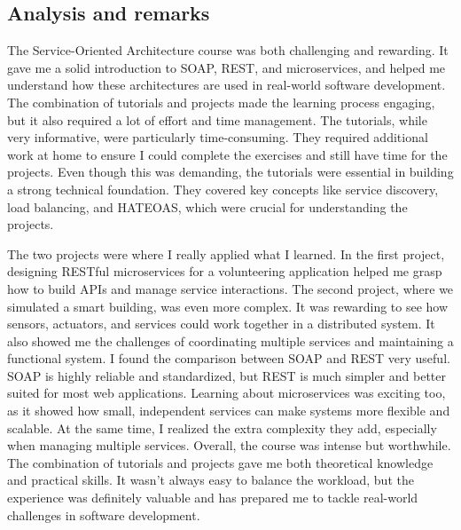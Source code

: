 \subsection{Analysis and remarks}

\indent \indent The Service-Oriented Architecture course was both challenging and rewarding. It gave me a solid introduction to SOAP, REST, and microservices, and helped me understand how these architectures are used in real-world software development. The combination of tutorials and projects made the learning process engaging, but it also required a lot of effort and time management.
\noindent The tutorials, while very informative, were particularly time-consuming. They required additional work at home to ensure I could complete the exercises and still have time for the projects. Even though this was demanding, the tutorials were essential in building a strong technical foundation. They covered key concepts like service discovery, load balancing, and HATEOAS, which were crucial for understanding the projects.
\vspace{0.25cm}

The two projects were where I really applied what I learned. In the first project, designing RESTful microservices for a volunteering application helped me grasp how to build APIs and manage service interactions. The second project, where we simulated a smart building, was even more complex. It was rewarding to see how sensors, actuators, and services could work together in a distributed system. It also showed me the challenges of coordinating multiple services and maintaining a functional system.
\noindent I found the comparison between SOAP and REST very useful. SOAP is highly reliable and standardized, but REST is much simpler and better suited for most web applications. Learning about microservices was exciting too, as it showed how small, independent services can make systems more flexible and scalable. At the same time, I realized the extra complexity they add, especially when managing multiple services.
\vspace{0.25cm}
\newpage
Overall, the course was intense but worthwhile. The combination of tutorials and projects gave me both theoretical knowledge and practical skills. It wasn't always easy to balance the workload, but the experience was definitely valuable and has prepared me to tackle real-world challenges in software development.